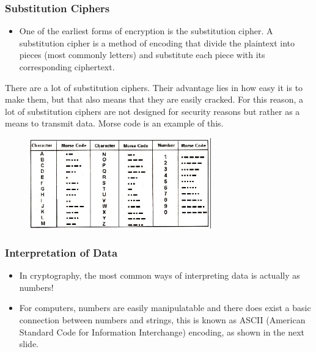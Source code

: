 \documentclass{beamer}
\begin{document}
\begin{frame}
\frametitle{Substitution Ciphers}
\begin{itemize}
    \item One of the earliest forms of encryption is the substitution cipher. A
        substitution cipher is a method of encoding that divide the plaintext
        into pieces (most commonly letters) and substitute each piece with its
        corresponding ciphertext.
\end{itemize}
\end{frame}

\begin{frame}
    There are a lot of substitution ciphers. Their advantage lies in how easy it
    is to make them, but that also means that they are easily cracked. For this
    reason, a lot of substitution ciphers are not designed for security reasons
    but rather as a means to transmit data. Morse code is an example of this.

    \begin{figure}[h]
        \includegraphics[width=0.7\textwidth]{morse-code-table}
    \end{figure}
\end{frame}

\begin{frame}
    \frametitle{Interpretation of Data}
    \begin{itemize}
        \item In cryptography, the most common ways of interpreting data is
            actually as numbers!
        \item For computers, numbers are easily manipulatable and there does
            exist a basic connection between numbers and strings, this is known
            as ASCII (American Standard Code for Information Interchange)
            encoding, as shown in the next slide.
    \end{itemize}
\end{frame}
\end{document}
